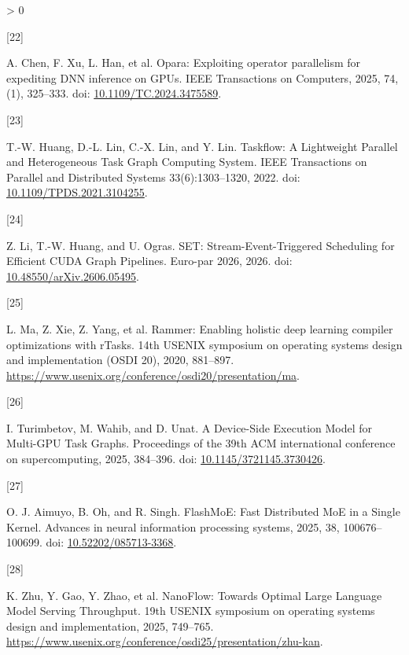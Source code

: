 \documentclass[UTF8,10.5pt,fontset=windows]{ctexart}
\newlength{\cslhangindent}
\newlength{\csllabelwidth}
\newenvironment{CSLReferences}[2] %
 {%
  \setlength{\parindent}{0pt}
  \ifodd #1 \everypar{\setlength{\hangindent}{\cslhangindent}}\ignorespaces\fi
  \ifnum #2 > 0
  \setlength{\parskip}{#2\baselineskip}
  \fi
 }%
 {}
\newcommand{\CSLLeftMargin}[1]{\parbox[t]{\csllabelwidth}{#1}}
\newcommand{\CSLRightInline}[1]{\parbox[t]{\linewidth - \csllabelwidth}{#1}\break}
\begin{document}
\begin{CSLReferences}{0}{0}
\leavevmode{}%
\CSLLeftMargin{{[}22{]} }
\CSLRightInline{A. Chen, F. Xu, L. Han, et al. Opara: Exploiting
operator parallelism for expediting DNN inference on GPUs. IEEE
Transactions on Computers, 2025, 74, (1), 325--333. doi:
\href{https://doi.org/10.1109/TC.2024.3475589}{10.1109/TC.2024.3475589}.}

\leavevmode{}%
\CSLLeftMargin{{[}23{]} }
\CSLRightInline{T.-W. Huang, D.-L. Lin, C.-X. Lin, and Y. Lin.
{Taskflow: A Lightweight Parallel and Heterogeneous Task Graph Computing
System}. IEEE Transactions on Parallel and Distributed Systems
33(6):1303--1320, 2022. doi:
\href{https://doi.org/10.1109/TPDS.2021.3104255}{10.1109/TPDS.2021.3104255}.}

\leavevmode{}%
\CSLLeftMargin{{[}24{]} }
\CSLRightInline{Z. Li, T.-W. Huang, and U. Ogras. {SET:
Stream-Event-Triggered Scheduling for Efficient CUDA Graph Pipelines}.
Euro-par 2026, 2026. doi:
\href{https://doi.org/10.48550/arXiv.2606.05495}{10.48550/arXiv.2606.05495}.}

\leavevmode{}%
\CSLLeftMargin{{[}25{]} }
\CSLRightInline{L. Ma, Z. Xie, Z. Yang, et al. Rammer: Enabling holistic
deep learning compiler optimizations with rTasks. 14th USENIX symposium
on operating systems design and implementation (OSDI 20), 2020,
881--897.
\url{https://www.usenix.org/conference/osdi20/presentation/ma}.}

\leavevmode{}%
\CSLLeftMargin{{[}26{]} }
\CSLRightInline{I. Turimbetov, M. Wahib, and D. Unat. {A Device-Side
Execution Model for Multi-GPU Task Graphs}. Proceedings of the 39th ACM
international conference on supercomputing, 2025, 384--396. doi:
\href{https://doi.org/10.1145/3721145.3730426}{10.1145/3721145.3730426}.}

\leavevmode{}%
\CSLLeftMargin{{[}27{]} }
\CSLRightInline{O. J. Aimuyo, B. Oh, and R. Singh. {FlashMoE: Fast
Distributed MoE in a Single Kernel}. Advances in neural information
processing systems, 2025, 38, 100676--100699. doi:
\href{https://doi.org/10.52202/085713-3368}{10.52202/085713-3368}.}

\leavevmode{}%
\CSLLeftMargin{{[}28{]} }
\CSLRightInline{K. Zhu, Y. Gao, Y. Zhao, et al. {NanoFlow: Towards
Optimal Large Language Model Serving Throughput}. 19th USENIX symposium
on operating systems design and implementation, 2025, 749--765.
\url{https://www.usenix.org/conference/osdi25/presentation/zhu-kan}.}


\end{CSLReferences}
\end{document}
